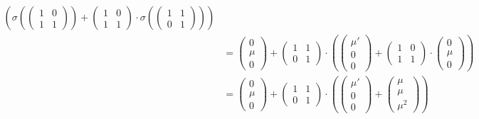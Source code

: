 \begin{align*}
\left(
	\sigma\left(
		\left(\begin{matrix} 1 & 0 \\ 1 & 1 \end{matrix}\right)
	\right) +
	\left(\begin{matrix} 1 & 0 \\ 1 & 1 \end{matrix}\right)\cdot
	\sigma\left(
		\left(\begin{matrix} 1 & 1 \\ 0 & 1 \end{matrix}\right)
	\right)
\right)\\ 
&=
\left(\begin{matrix} 0 \\ \mu \\ 0 \end{matrix}\right)
+
\left(\begin{matrix} 1 & 1 \\ 0 & 1 \end{matrix}\right) \cdot
\left(
	\left(\begin{matrix} \mu' \\ 0 \\ 0 \end{matrix}\right)
	+
	\left(\begin{matrix} 1 & 0 \\ 1 & 1 \end{matrix}\right)\cdot
	\left(\begin{matrix} 0 \\ \mu \\ 0 \end{matrix}\right)
\right)\\ 
&=
\left(\begin{matrix} 0 \\ \mu \\ 0 \end{matrix}\right)
+
\left(\begin{matrix} 1 & 1 \\ 0 & 1 \end{matrix}\right) \cdot
\left(
	\left(\begin{matrix} \mu' \\ 0 \\ 0 \end{matrix}\right)
	+
	\left(\begin{matrix} \mu \\ \mu \\ \mu^2 \end{matrix}\right)
\right)\\ 

\end{align*}
